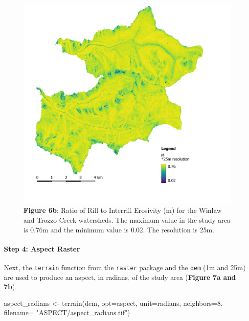 \documentclass[
]{article}
\newenvironment{Shaded}{\begin{snugshade}}{\end{snugshade}}
\newcommand{\AttributeTok}[1]{\textcolor[rgb]{0.77,0.63,0.00}{#1}}
\newcommand{\DecValTok}[1]{\textcolor[rgb]{0.00,0.00,0.81}{#1}}
\newcommand{\FunctionTok}[1]{\textcolor[rgb]{0.00,0.00,0.00}{#1}}
\newcommand{\NormalTok}[1]{#1}
\newcommand{\OtherTok}[1]{\textcolor[rgb]{0.56,0.35,0.01}{#1}}
\newcommand{\StringTok}[1]{\textcolor[rgb]{0.31,0.60,0.02}{#1}}
\begin{document}
\begin{figure}
\centering
\includegraphics{img/m_25m.png}
\caption{\textbf{Figure 6b}: Ratio of Rill to Interrill Erosivity (m) for the Winlaw and Trozzo Creek watersheds. The maximum value in the study area is 0.76m and the minimum value is 0.02. The resolution is 25m.}
\end{figure}

\hypertarget{sec-step-4-ls}{%
\paragraph*{Step 4: Aspect Raster}\label{sec-step-4-ls}}

Next, the \texttt{terrain} function from the \texttt{raster} package and the \texttt{dem} (1m and 25m) are used to produce an aspect, in radians, of the study area (\textbf{Figure 7a and 7b}).

\begin{Shaded}
\begin{Highlighting}[]
\NormalTok{aspect\_radians }\OtherTok{\textless{}{-}}  \FunctionTok{terrain}\NormalTok{(dem, }\AttributeTok{opt=}\StringTok{\textquotesingle{}aspect\textquotesingle{}}\NormalTok{, }\AttributeTok{unit=}\StringTok{\textquotesingle{}radians\textquotesingle{}}\NormalTok{, }\AttributeTok{neighbors=}\DecValTok{8}\NormalTok{, }
                           \AttributeTok{filename=} \StringTok{"ASPECT/aspect\_radians.tif"}\NormalTok{)}
\end{Highlighting}
\end{Shaded}
\end{document}

